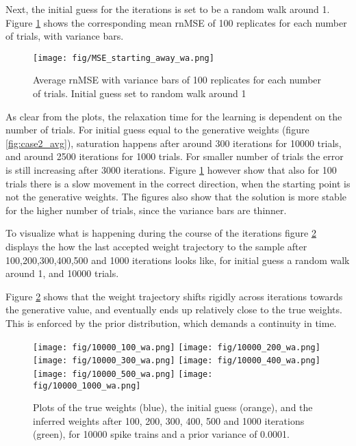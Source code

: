 

Next, the initial guess for the iterations is set to be a random walk around 1. Figure \ref{fig:MSE2} shows the corresponding mean rnMSE of 100 replicates for each number of trials, with variance bars. 



\begin{figure}[hbt!]
\caption{Average rnMSE with variance bars of 100 replicates for each number of trials. Initial guess set to random walk around 1}
\label{fig:MSE2}
    \centering
    \texttt{[image: fig/MSE\_starting\_away\_wa.png]}
\end{figure}

As clear from the plots, the relaxation time for the learning is dependent on the number of trials. For initial guess equal to the generative weights (figure \ref{fig:case2_avg}), saturation happens after around 300 iterations for 10000 trials, and around 2500 iterations for 1000 trials. For smaller number of trials the error is still increasing after 3000 iterations. Figure \ref{fig:MSE2} however show that also for 100 trials there is a slow movement in the correct direction, when the starting point is not the generative weights. The figures also show that the solution is more stable for the higher number of trials, since the variance bars are thinner.  

To visualize what is happening during the course of the iterations figure \ref{fig:trajectories} displays the how the last accepted weight trajectory to the sample after 100,200,300,400,500 and 1000 iterations looks like, for initial guess a random walk around 1, and 10000 trials. 

Figure \ref{fig:trajectories} shows that the weight trajectory shifts rigidly across iterations towards the generative value, and eventually ends up relatively close to the true weights. This is enforced by the prior distribution, which demands a continuity in time. 

\begin{figure}[P]
\caption{Plots of the true weights (blue), the initial guess (orange), and the inferred weights after 100, 200, 300, 400, 500 and 1000 iterations (green), for 10000 spike trains and a prior variance of 0.0001.}
\label{fig:trajectories}
    \centering
    \texttt{[image: fig/10000\_100\_wa.png]}
    \texttt{[image: fig/10000\_200\_wa.png]}\\
    \texttt{[image: fig/10000\_300\_wa.png]}
    \texttt{[image: fig/10000\_400\_wa.png]}\\
    \texttt{[image: fig/10000\_500\_wa.png]}
    \texttt{[image: fig/10000\_1000\_wa.png]}
\end{figure}

